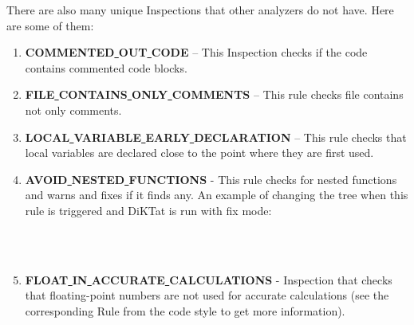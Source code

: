 There are also many unique Inspections that other analyzers do not have. Here are some of them:

\begin{enumerate}
    \item \textbf{COMMENTED\underline{ }OUT\underline{ }CODE} – This Inspection checks if the code contains commented code blocks.
    \item \textbf{FILE\underline{ }CONTAINS\underline{ }ONLY\underline{ }COMMENTS} – This rule checks file contains not only comments.
    \item \textbf{LOCAL\underline{ }VARIABLE\underline{ }EARLY\underline{ }DECLARATION} – This rule checks that local variables are declared close to the point where they are first used.
    \item \textbf{AVOID\underline{ }NESTED\underline{ }FUNCTIONS} - This rule checks for nested functions and warns and fixes if it finds any. An example of changing the tree when this rule is triggered and DiKTat is run with fix mode:\\\\
\\
    \item \textbf{FLOAT\underline{ }IN\underline{ }ACCURATE\underline{ }CALCULATIONS} - Inspection that checks that floating-point numbers are not used for accurate calculations (see the corresponding Rule from the code style to get more information).


\end{enumerate}
